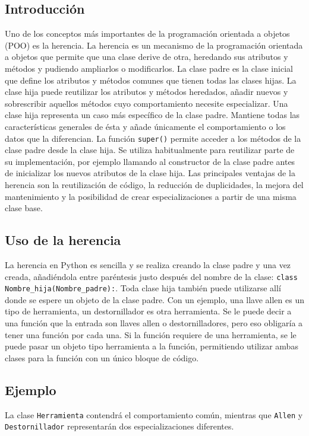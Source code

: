 \documentclass[11pt,a5paper,twoside]{book}
\begin{document}
\subsection{Introducción}
Uno de los conceptos más importantes de la programación orientada a objetos (POO) es la herencia. La herencia es un mecanismo de la programación orientada a objetos que permite que una clase derive de otra, heredando sus atributos y métodos y pudiendo ampliarlos o modificarlos.
La clase padre es la clase inicial que define los atributos y métodos comunes que tienen todas las clases hijas. La clase hija puede reutilizar los atributos y métodos heredados, añadir nuevos y sobrescribir aquellos métodos cuyo comportamiento necesite especializar.
Una clase hija representa un caso más específico de la clase padre. Mantiene todas las características generales de ésta y añade únicamente el comportamiento o los datos que la diferencian.
La función {\scriptsize \texttt{super()}} permite acceder a los métodos de la clase padre desde la clase hija. Se utiliza habitualmente para reutilizar parte de su implementación, por ejemplo llamando al constructor de la clase padre antes de inicializar los nuevos atributos de la clase hija.
Las principales ventajas de la herencia son la reutilización de código, la reducción de duplicidades, la mejora del mantenimiento y la posibilidad de crear especializaciones a partir de una misma clase base.
\subsection{Uso de la herencia}
La herencia en Python es sencilla y se realiza creando la clase padre y una vez creada, añadiéndola entre paréntesis justo después del nombre de la clase: {\scriptsize \texttt{class Nombre\_hija(Nombre\_padre):}}.
Toda clase hija también puede utilizarse allí donde se espere un objeto de la clase padre. Con un ejemplo, una llave allen es un tipo de herramienta, un destornillador es otra herramienta. Se le puede decir a una función que la entrada son llaves allen o destornilladores, pero eso obligaría a tener una función por cada una. Si la función requiere de una herramienta, se le puede pasar un objeto tipo herramienta a la función, permitiendo utilizar ambas clases para la función con un único bloque de código.
\subsection{Ejemplo}
La clase {\scriptsize \texttt{Herramienta}} contendrá el comportamiento común, mientras que {\scriptsize \texttt{Allen}} y {\scriptsize \texttt{Destornillador}} representarán dos especializaciones diferentes.
\end{document}
